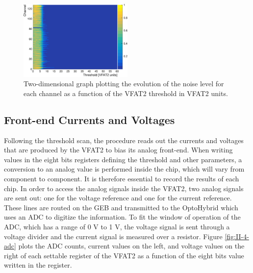       \begin{figure}[h!]
        \centering
        \includegraphics[width=0.5\textwidth]{img/plots/cThreshold_Channel-crop}
        \caption{Two-dimensional graph plotting the evolution of the noise level for each channel as a function of the VFAT2 threshold in VFAT2 units.}
        \label{fig:II-4-threshold}
      \end{figure}

    \subsection{Front-end Currents and Voltages}

      Following the threshold scan, the procedure reads out the currents and voltages that are produced by the VFAT2 to bias its analog front-end. When writing values in the eight bits registers defining the threshold and other parameters, a conversion to an analog value is performed inside the chip, which will vary from component to component. It is therefore essential to record the results of each chip. In order to access the analog signals inside the VFAT2, two analog signals are sent out: one for the voltage reference and one for the current reference. These lines are routed on the GEB and transmitted to the OptoHybrid which uses an ADC to digitize the information. To fit the window of operation of the ADC, which has a range of 0 V to 1 V, the voltage signal is sent through a voltage divider and the current signal is measured over a resistor. Figure \ref{fig:II-4-adc} plots the ADC counts, current values on the left, and voltage values on the right of each settable register of the VFAT2 as a function of the eight bits value written in the register. \\


